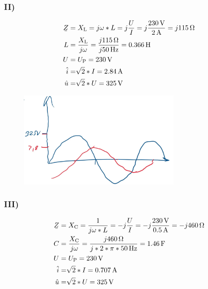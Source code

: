 \documentclass[../../document.tex]{subfiles}
\begin{document}
\subsubsection*{II)}

\begin{equation*}
    \begin{split}
        \ubar{Z} &= X\cind{L} = j \omega * L = j \frac{U}{I} = j \frac{\SI{230}{\volt}}{\SI{2}{\ampere}} = j \SI{115}{\ohm}\\
        L &= \frac{X\cind{L}}{j\omega} = \frac{j \SI{115}{\ohm}}{j \SI{50}{\hertz}} = \SI{0,366}{\henry}\\
        U &= U\cind{P} = \SI{230}{\volt}\\
        \hat{i} &= \sqrt[]{2} * I = \SI{2,84}{\ampere}\\
        \hat{u} &= \sqrt[]{2} * U = \SI{325}{\volt}\\
    \end{split}
\end{equation*}

\begin{figure}[H]
    \begin{center}
        \includegraphics[width=8cm]{../../img/task1-a-ii.jpeg}
    \end{center}
\end{figure}

\subsubsection*{III)}

\begin{equation*}
    \begin{split}
        \ubar{Z} &= X\cind{C} = \frac{1}{j \omega * L} = -j \frac{U}{I} = -j \frac{\SI{230}{\volt}}{\SI{0,5}{\ampere}} = -j \SI{460}{\ohm}\\
        C &= \frac{X\cind{C}}{j\omega} = \frac{j \SI{460}{\ohm}}{j * 2 * \pi * \SI{50}{\hertz}} = \SI{1,46}{\farad}\\
        U &= U\cind{P} = \SI{230}{\volt}\\
        \hat{i} &= \sqrt[]{2} * I = \SI{0,707}{\ampere}\\
        \hat{u} &= \sqrt[]{2} * U = \SI{325}{\volt}\\
    \end{split}
\end{equation*}
\end{document}
